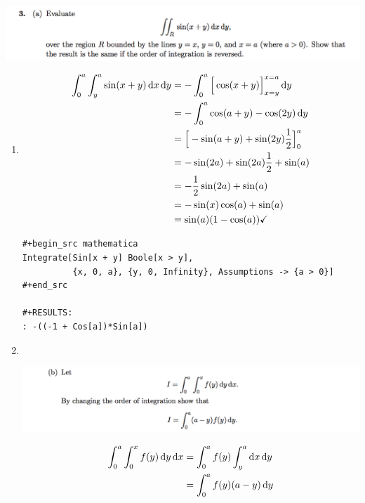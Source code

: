\documentclass[12pt]{article}
\begin{document}
\newpage
\subsection{}
\begin{mdframed}
  \includegraphics[width=400pt]{img/oxford-prelims-M5-multivariable-calc-1-3-a.png}
\end{mdframed}

\begin{enumerate}[label=(\alph*)]
\item
  \begin{align*}
    \int_0^a \int_y^a \sin(x + y) \dx \dy
    &= -\int_0^a \Big[\cos(x + y)\Big]_{x=y}^{x=a} \dy\\
    &= -\int_0^a \cos(a + y) - \cos(2y) \dy\\
    &= \Big[-\sin(a + y) + \sin(2y)\frac{1}{2}\Big]_0^a \\
    &= -\sin(2a) + \sin(2a)\frac{1}{2} + \sin(a)\\
    &= -\frac{1}{2}\sin(2a) + \sin(a)\\
    &= -\sin(x)\cos(a) + \sin(a)\\
    &= \sin(a)(1 - \cos(a)) \checkmark
  \end{align*}

\begin{verbatim}
#+begin_src mathematica
Integrate[Sin[x + y] Boole[x > y],
          {x, 0, a}, {y, 0, Infinity}, Assumptions -> {a > 0}]
#+end_src

#+RESULTS:
: -((-1 + Cos[a])*Sin[a])

\end{verbatim}

  \newpage
\item~\\
  \begin{mdframed}
    \includegraphics[width=400pt]{img/oxford-prelims-M5-multivariable-calc-1-3-b.png}
  \end{mdframed}
  \begin{align*}
    \int_0^a\int_0^x f(y) \dy \dx
    &= \int_0^a f(y) \int_y^a \dx \dy\\
    &= \int_0^a f(y) (a - y) \dy\\
  \end{align*}
\end{enumerate}
\end{document}
